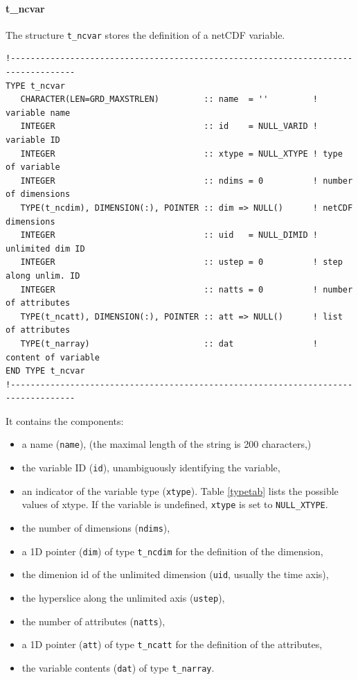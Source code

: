 \documentclass[11pt,twoside]{article}
\begin{document}
\paragraph{{t\_ncvar}\label{Tncvar}\\}
The structure \verb|t_ncvar| stores the definition of a netCDF
variable. 
\begin{verbatim}
!-----------------------------------------------------------------------------------
TYPE t_ncvar
   CHARACTER(LEN=GRD_MAXSTRLEN)         :: name  = ''         ! variable name
   INTEGER                              :: id    = NULL_VARID ! variable ID
   INTEGER                              :: xtype = NULL_XTYPE ! type of variable
   INTEGER                              :: ndims = 0          ! number of dimensions
   TYPE(t_ncdim), DIMENSION(:), POINTER :: dim => NULL()      ! netCDF dimensions
   INTEGER                              :: uid   = NULL_DIMID ! unlimited dim ID
   INTEGER                              :: ustep = 0          ! step along unlim. ID
   INTEGER                              :: natts = 0          ! number of attributes
   TYPE(t_ncatt), DIMENSION(:), POINTER :: att => NULL()      ! list of attributes
   TYPE(t_narray)                       :: dat                ! content of variable
END TYPE t_ncvar
!-----------------------------------------------------------------------------------
\end{verbatim}

It contains the components:
\begin{itemize}
\item a name (\verb|name|), (the maximal length of the string is 200 characters,)
\item the variable ID (\verb|id|), unambiguously identifying the variable,
\item an indicator of the variable type (\verb|xtype|). Table \ref{typetab}
lists the possible values of xtype. If the variable is undefined, \verb|xtype|
 is set to \verb|NULL_XTYPE|.
\item  the number of dimensions (\verb|ndims|), 
\item a 1D pointer (\verb|dim|) of type \verb|t_ncdim| for the definition of the dimension,
\item the dimenion id of the unlimited dimension (\verb|uid|, usually the time axis),
\item the hyperslice along the unlimited axis (\verb|ustep|), 
\item the number of attributes (\verb|natts|),
\item a 1D pointer (\verb|att|) of type \verb|t_ncatt| for the definition of the attributes,
\item the variable contents (\verb|dat|) of type \verb|t_narray|.
\end{itemize}
\end{document}
